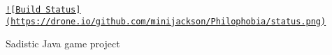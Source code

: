 \href{https://drone.io/github.com/minijackson/Philophobia/latest}{\tt !\mbox{[}Build Status\mbox{]}(https\-://drone.\-io/github.\-com/minijackson/\-Philophobia/status.\-png)}

Sadistic Java game project 